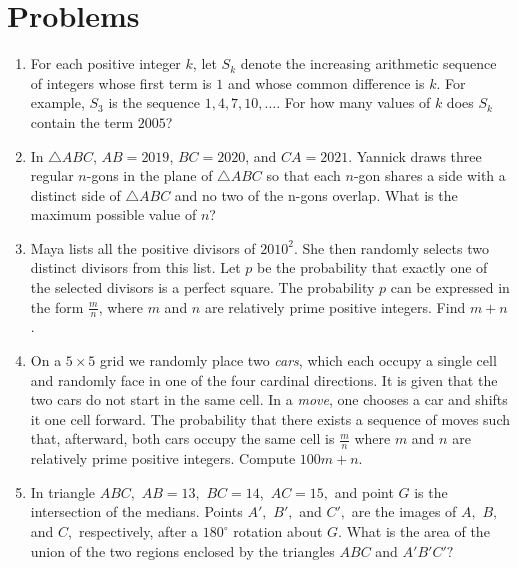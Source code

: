 \documentclass[11pt]{article}
\begin{document}
\maketitle

\section{Problems}

\begin{enumerate}
 \item For each positive integer $k$, let $S_k$ denote the increasing arithmetic sequence of integers whose first term is $1$ and whose common difference is $k$. For example, $S_3$ is the sequence $1,4,7,10,\ldots.$ For how many values of $k$ does $S_k$ contain the term $2005$?

 \item In $\triangle ABC$, $AB = 2019$, $BC = 2020$, and $CA = 2021$. Yannick draws three regular $n$-gons in the plane of $\triangle ABC$ so that each $n$-gon shares a side with a distinct side of $\triangle ABC$ and no two of the n-gons overlap. What is the maximum possible value of $n$?

 \item Maya lists all the positive divisors of $2010^2$. She then randomly selects two distinct divisors from this list. Let $p$ be the probability that exactly one of the selected divisors is a perfect square. The probability $p$ can be expressed in the form $\frac {m}{n}$, where $m$ and $n$ are relatively prime positive integers. Find $m + n$.

 \item On a $5 \times 5$ grid we randomly place two \emph{cars}, which each occupy a single cell and randomly face in one of the four cardinal directions. It is given that the two cars do not start in the same cell. In a \emph{move}, one chooses a car and shifts it one cell forward. The probability that there exists a sequence of moves such that, afterward, both cars occupy the same cell is $\frac{m}{n}$ where $m$ and $n$ are relatively prime positive integers. Compute $100m + n$.

 \item In triangle $ABC,$ $AB = 13,$ $BC = 14,$ $AC = 15,$ and point $G$ is the intersection of the medians. Points $A',$ $B',$ and $C',$ are the images of $A,$ $B,$ and $C,$ respectively, after a $180^\circ$ rotation about $G.$ What is the area of the union of the two regions enclosed by the triangles $ABC$ and $A'B'C'?$


\end{enumerate}
\end{document}
